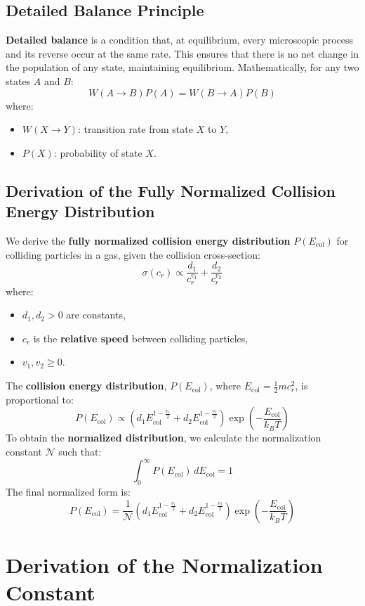\subsection{Detailed Balance Principle}
\textbf{Detailed balance} is a condition that, at equilibrium, every microscopic process and its reverse occur at the same rate. This ensures that there is no net change in the population of any state, maintaining equilibrium. Mathematically, for any two states \(A\) and \(B\):
\[
W(A \to B) P(A) = W(B \to A) P(B)
\]
where:
\begin{itemize}
    \item \(W(X \to Y)\): transition rate from state \(X\) to \(Y\),
    \item \(P(X)\): probability of state \(X\).
\end{itemize}


\subsection{Derivation of the Fully Normalized Collision Energy Distribution}

We derive the \textbf{fully normalized collision energy distribution} \( P(E_{\text{col}}) \) for colliding particles in a gas, given the collision cross-section:
\[
\sigma(c_r) \propto \frac{d_1}{c_r^{v_1}} + \frac{d_2}{c_r^{v_2}}
\]
where:
\begin{itemize}
    \item \( d_1, d_2 > 0 \) are constants,
    \item \( c_r \) is the \textbf{relative speed} between colliding particles,
    \item \( v_1, v_2 \geq 0 \).
\end{itemize}

The \textbf{collision energy distribution}, \( P(E_{\text{col}}) \), where \( E_{\text{col}} = \frac{1}{2} m c_r^2 \), is proportional to:
\[
P(E_{\text{col}}) \propto \left( d_1 E_{\text{col}}^{1 - \frac{v_1}{2}} + d_2 E_{\text{col}}^{1 - \frac{v_2}{2}} \right) \exp\left( -\frac{E_{\text{col}}}{k_B T} \right)
\]
To obtain the \textbf{normalized distribution}, we calculate the normalization constant \( \mathcal{N} \) such that:
\[
\int_{0}^{\infty} P(E_{\text{col}}) \, dE_{\text{col}} = 1
\]
The final normalized form is:
\[
P(E_{\text{col}}) = \frac{1}{\mathcal{N}} \left( d_1 E_{\text{col}}^{1 - \frac{v_1}{2}} + d_2 E_{\text{col}}^{1 - \frac{v_2}{2}} \right) \exp\left( -\frac{E_{\text{col}}}{k_B T} \right)
\]

\section{Derivation of the Normalization Constant}

